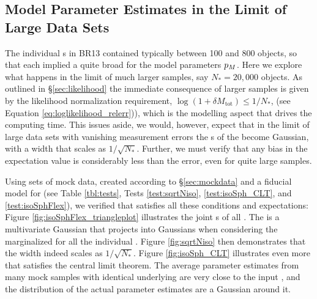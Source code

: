 \subsection{Model Parameter Estimates in the Limit of Large Data Sets} \label{sec:largedata}

The individual \MAP{}s in BR13 contained typically between 100 and 800 objects, so that each \MAP{} implied a quite broad \pdf{} for the model parameters $p_M{}$. Here we explore what happens in the limit of much larger samples, say $N_{*} = 20,000$ objects. As outlined in \S\ref{sec:likelihood} the immediate consequence of larger samples is given by the likelihood normalization requirement, $\log(1+\delta M_\text{tot})\le 1/N_{*}$, (see Equation \ref{eq:loglikelihood_relerr})), which is the modelling aspect that drives the computing time. This issues aside, we would, however, expect that in the limit of large data sets with vanishing measurement errors the \pdf{}s of the \pmodel{} become Gaussian, with a \pdf{} width that scales as $1/\sqrt{N_{*}}$. Further, we must verify that any bias in the \pdf{} expectation value is considerably less than the error, even for quite large samples.

Using sets of mock data, created according to \S\ref{sec:mockdata} and a fiducial model for \pmodel{} (see Table \ref{tbl:tests}, Tests \ref{test:sqrtNiso}, \ref{test:isoSph_CLT}, and \ref{test:isoSphFlex}), we verified that \RM{} satisfies all these conditions and expectations: Figure \ref{fig:isoSphFlex_triangleplot} illustrates the joint \pdf{}s of all \pmodel{}. The \pdf{} is a multivariate Gaussian that projects into Gaussians when considering the marginalized \pdf{} for all the individual \pmodel{}. Figure \ref{fig:sqrtNiso} then demonstrates that the \pdf{} width indeed scales as $1/\sqrt{N_{*}}$. Figure \ref{fig:isoSph_CLT} illustrates even more that \RM{} satisfies the central limit theorem. The average parameter estimates from many mock samples with identical underlying \pmodel{} are very close to the input \pmodel{}, and the distribution of the actual parameter estimates are a Gaussian around it. 


